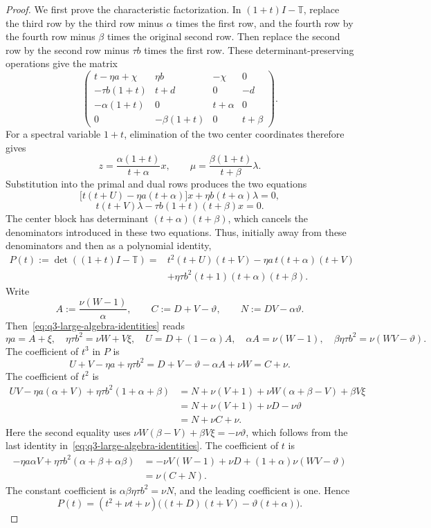 \begin{proof}
We first prove the characteristic factorization. In
\((1+t)I-\mathbb{T}\), replace the third row by the third row minus
\(\alpha\) times the first row, and the fourth row by the fourth row
minus \(\beta\) times the original second row. Then replace the second
row by the second row minus \(\tau b\) times the first row.
These determinant-preserving operations give the matrix
\[
\begin{pmatrix}
t-\eta a+\chi&\eta b&-\chi&0\\
-\tau b(1+t)&t+d&0&-d\\
-\alpha(1+t)&0&t+\alpha&0\\
0&-\beta(1+t)&0&t+\beta
\end{pmatrix}.
\]
For a spectral variable \(1+t\), elimination of the two center
coordinates therefore gives
\[
z=\frac{\alpha(1+t)}{t+\alpha}x,
\qquad
\mu=\frac{\beta(1+t)}{t+\beta}\lambda.
\]
Substitution into the primal and dual rows produces the two equations
\[
\bigl[t(t+U)-\eta a(t+\alpha)\bigr]x
       +\eta b(t+\alpha)\lambda=0,
\]
\[
t(t+V)\lambda-\tau b(1+t)(t+\beta)x=0.
\]
The center block has determinant \((t+\alpha)(t+\beta)\),
which cancels the denominators introduced in these two equations.
Thus, initially away from these denominators and then as a polynomial
identity,
\begin{equation}
\begin{aligned}
P(t):=\det((1+t)I-\mathbb{T})
={}&t^2(t+U)(t+V)-\eta a\,t(t+\alpha)(t+V)\\
&+\eta\tau b^2(t+1)(t+\alpha)(t+\beta).
\end{aligned}
\label{eq:q3-large-characteristic-unfactored}
\end{equation}
Write
\[
A:=\frac{\nu(W-1)}{\alpha},\qquad
C:=D+V-\vartheta,\qquad N:=DV-\alpha\vartheta.
\]
Then~\eqref{eq:q3-large-algebra-identities} reads
\[
\eta a=A+\xi,\quad
\eta\tau b^2=\nu W+V\xi,\quad
U=D+(1-\alpha)A,\quad
\alpha A=\nu(W-1),\quad
\beta\eta\tau b^2=\nu(WV-\vartheta).
\]
The coefficient of \(t^3\) in \(P\) is
\[
U+V-\eta a+\eta\tau b^2
=D+V-\vartheta-\alpha A+\nu W=C+\nu.
\]
The coefficient of \(t^2\) is
\[
\begin{aligned}
UV-\eta a(\alpha+V)+\eta\tau b^2(1+\alpha+\beta)
&=N+\nu(V+1)+\nu W(\alpha+\beta-V)+\beta V\xi\\
&=N+\nu(V+1)+\nu D-\nu\vartheta\\
&=N+\nu C+\nu.
\end{aligned}
\]
Here the second equality uses
\(\nu W(\beta-V)+\beta V\xi=-\nu\vartheta\), which follows
from the last identity in~\eqref{eq:q3-large-algebra-identities}.
The coefficient of \(t\) is
\[
\begin{aligned}
-\eta a\alpha V+\eta\tau b^2(\alpha+\beta+\alpha\beta)
&=-\nu V(W-1)+\nu D
   +(1+\alpha)\nu(WV-\vartheta)\\
&=\nu(C+N).
\end{aligned}
\]
The constant coefficient is
\(\alpha\beta\eta\tau b^2=\nu N\), and the leading coefficient
is one. Hence
\begin{equation}
P(t)=(t^2+\nu t+\nu)
       \bigl((t+D)(t+V)-\vartheta(t+\alpha)\bigr).
\label{eq:q3-large-characteristic-factorization}
\end{equation}


\end{proof}
